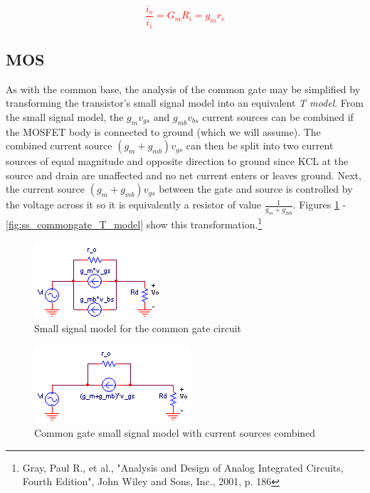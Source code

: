 \textcolor{red}{
\begin{equation}
\frac{i_{o}}{i_{i}} = G_{m}R_{i} = g_{m}r_{e}
\end{equation}
}

\subsection{MOS}
\par
As with the common base, the analysis of the common gate may be simplified by transforming the transistor's small signal model into an equivalent \textsl{T model}. From the small signal model, the $g_{m}v_{gs}$ and $g_{mb}v_{bs}$ current sources can be combined if the MOSFET body is connected to ground (which we will assume). The combined current source $(g_{m}+g_{mb})v_{gs}$ can then be split into two current sources of equal magnitude and opposite direction to ground since KCL at the source and drain are unaffected and no net current enters or leaves ground. Next, the current source $(g_{m}+g_{mb})v_{gs}$ between the gate and source is controlled by the voltage across it so it is equivalently a resistor of value $\frac{1}{g_{m}+g_{mb}}$. Figures \ref{fig:ss_commongate_initial} - \ref{fig:ss_commongate_T_model} show this transformation.\footnote{Gray, Paul R., et al., "Analysis and Design of Analog Integrated Circuits, Fourth Edition", John Wiley and Sons, Inc., 2001, p. 186}

\begin{figure}[h]
	\centering
		\includegraphics{schematics/ss_commongate_initial.PNG}
	\caption{Small signal model for the common gate circuit}
	\label{fig:ss_commongate_initial}
\end{figure}

\begin{figure}[h]
	\centering
		\includegraphics{schematics/ss_commongate_combine.PNG}
	\caption{Common gate small signal model with current sources combined}
	\label{fig:ss_commongate_combine}
\end{figure}

